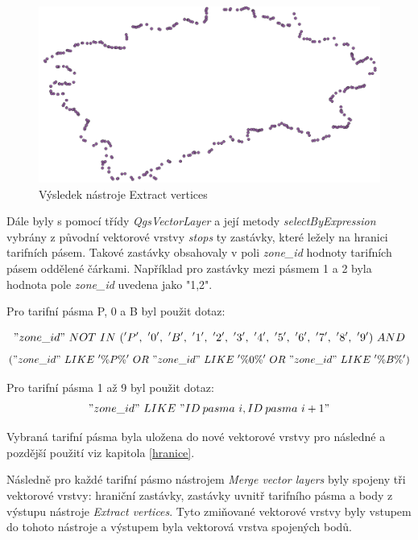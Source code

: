 \begin{figure}[H] \centering
    \includegraphics[width=400pt]{./pictures/vertices-P0B.png}
    \caption[Výsledek nástroje Extract vertices]{Výsledek nástroje Extract vertices}
	\label{fig:vertices-P0B}              
\end{figure} 

Dále byly s pomocí třídy \textit{QgsVectorLayer} a její metody \textit{selectByExpression} vybrány 
z původní vektorové vrstvy \textit{stops} ty zastávky, které ležely na hranici tarifních pásem.
Takové zastávky obsahovaly v poli \textit{zone\_id} hodnoty tarifních pásem oddělené čárkami.
Například pro zastávky mezi pásmem 1 a 2 byla hodnota pole \textit{zone\_id} uvedena jako "1,2".

Pro tarifní pásma P, 0 a B byl použit dotaz:

\["zone\_id"\ NOT\ IN\ ('P',\ '0',\ 'B',\ '1',\ '2',\ '3',\ '4',\ '5',\ '6',\ '7',\ '8',\ '9')\ AND\]
\[("zone\_id"\ LIKE\ '\%P\%'\ OR\ "zone\_id"\ LIKE\ '\%0\%'\ OR\ "zone\_id"\ LIKE\ '\%B\%')\]

Pro tarifní pásma 1 až 9 byl použit dotaz:
\["zone\_id"\ LIKE\ "ID\: pasma\ i,ID\: pasma\ i+1"\]

Vybraná tarifní pásma byla uložena do nové vektorové vrstvy pro následné a pozdější použití viz kapitola \ref{hranice}.

Následně pro každé tarifní pásmo nástrojem \textit{Merge vector layers} byly spojeny tři vektorové vrstvy: hraniční zastávky, 
zastávky uvnitř tarifního pásma a body z výstupu nástroje \textit{Extract vertices}.
Tyto zmiňované vektorové vrstvy byly vstupem do tohoto nástroje a výstupem byla 
vektorová vrstva spojených bodů. 

